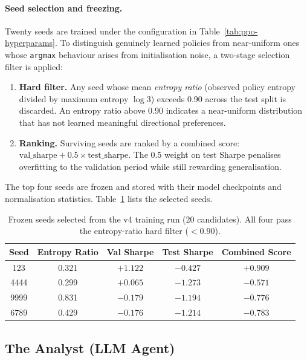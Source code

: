 \paragraph{Seed selection and freezing.}
\label{sec:seed-selection}
Twenty seeds are trained under the configuration in
Table~\ref{tab:ppo-hyperparams}. To distinguish genuinely learned policies
from near-uniform ones whose \texttt{argmax} behaviour arises from
initialisation noise, a two-stage selection filter is applied:

\begin{enumerate}
  \item \textbf{Hard filter.} Any seed whose mean \emph{entropy ratio}
    (observed policy entropy divided by maximum entropy $\log 3$) exceeds
    0.90 across the test split is discarded. An entropy ratio above 0.90
    indicates a near-uniform distribution that has not learned meaningful
    directional preferences.
  \item \textbf{Ranking.} Surviving seeds are ranked by a combined score:
    $\text{val\_sharpe} + 0.5 \times \text{test\_sharpe}$. The 0.5 weight
    on test Sharpe penalises overfitting to the validation period while
    still rewarding generalisation.
\end{enumerate}

The top four seeds are frozen and stored with their model checkpoints and
normalisation statistics. Table~\ref{tab:frozen-seeds} lists the selected
seeds.

\begin{table}[t]
\centering
\caption{Frozen seeds selected from the v4 training run (20 candidates).
  All four pass the entropy-ratio hard filter ($< 0.90$).}
\label{tab:frozen-seeds}
\begin{tabular}{@{}ccccc@{}}
\toprule
\textbf{Seed} & \textbf{Entropy Ratio} & \textbf{Val Sharpe}
  & \textbf{Test Sharpe} & \textbf{Combined Score} \\
\midrule
123  & 0.321 & $+1.122$ & $-0.427$ & $+0.909$ \\
4444 & 0.299 & $+0.065$ & $-1.273$ & $-0.571$ \\
9999 & 0.831 & $-0.179$ & $-1.194$ & $-0.776$ \\
6789 & 0.429 & $-0.176$ & $-1.214$ & $-0.783$ \\
\bottomrule
\end{tabular}
\end{table}


\subsection{The Analyst (LLM Agent)}
\label{sec:analyst}


